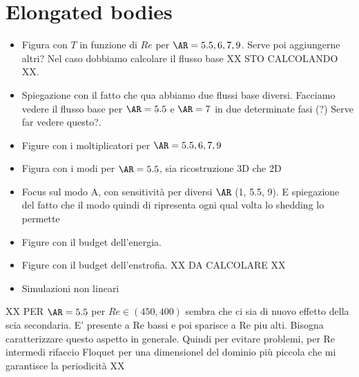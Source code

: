 \section{Elongated bodies}

\begin{itemize}
  \item Figura con $T$ in funzione di $Re$ per $\AR=5.5, 6, 7, 9$. Serve poi aggiungerne altri? Nel caso dobbiamo calcolare il flusso base XX STO CALCOLANDO XX.
  \item Spiegazione con il fatto che qua abbiamo due flussi base diversi. Facciamo vedere il flusso base per $\AR=5.5$ e $\AR=7$ in due determinate fasi (?) Serve far vedere questo?.  
  \item Figure con i moltiplicatori per $\AR=5.5, 6, 7, 9$
  \item Figura con i modi per $\AR=5.5$, sia ricostruzione 3D che 2D
  \item Focus sul modo A, con sensitività per diversi $\AR$ (1, 5.5, 9). E spiegazione del fatto che il modo quindi di ripresenta ogni qual volta lo shedding lo permette
  \item Figure con il budget dell'energia.
  \item Figure con il budget dell'enstrofia. XX DA CALCOLARE XX
  \item Simulazioni non lineari
\end{itemize}


XX PER $\AR=5.5$ per $Re \in (450,400)$ sembra che ci sia di nuovo effetto della scia secondaria. E' presente a Re bassi e poi sparisce a Re piu alti. Bisogna caratterizzare questo aspetto in generale. Quindi per evitare problemi, per Re intermedi rifaccio Floquet per una dimensionel del dominio più piccola che mi garantisce la periodicità XX

